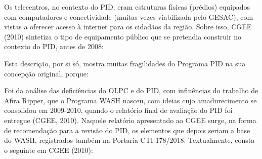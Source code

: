 \documentclass[
12pt,		%
openright,	%
twoside,  %
a4paper,			%
chapter=TITLE,		%
english,			%
french,				%
spanish,			%
brazil				%
]{USPSC-classe/USPSC}
\begin{document}
Os telecentros, no contexto do PID, eram estruturas f\'{\i}sicas (pr\'edios) equipados com computadores e conectividade (muitas vezes viabilizada pelo GESAC), com vistas a oferecer acesso \`a internet para os cidad\~aos da regi\~ao. Sobre isso, CGEE (2010) sintetiza o tipo de equipamento p\'ublico que se pretendia construir no contexto do PID, antes de 2008:





\noindent\begin{center}\mbox{\centering{}}\end{center}


Esta descri\c{c}\~ao, por si s\'o, mostra muitas fragilidades do Programa PID na sua concep\c{c}\~ao original, porque:





\noindent\begin{center}\mbox{\centering{}}\end{center}


Foi da an\'alise das defici\^encias do OLPC e do PID, com influ\^encias do trabalho de Afira Ripper, que o Programa WASH nasceu, com ideias cujo amadurecimento se consolidou em 2009-2010, quando o relat\'orio final de avalia\c{c}\~ao do PID foi entregue  (CGEE, 2010). Naquele relat\'orio apresentado ao CGEE surge, na forma de recomenda\c{c}\~ao para a revis\~ao do PID, os elementos que depois seriam a base do WASH, registrados tamb\'em na Portaria CTI 178/2018. Textualmente, consta o seguinte em  CGEE (2010):
\end{document}
